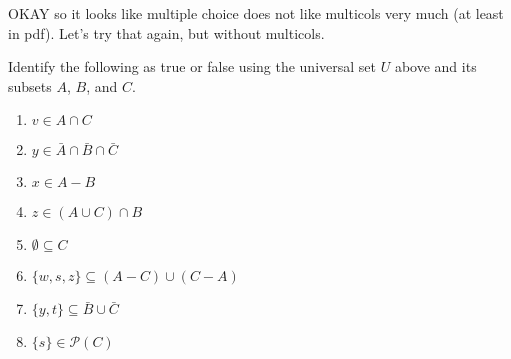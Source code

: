 \documentclass{ximera}
\begin{document}
OKAY so it looks like multiple choice does not like multicols very much (at least in pdf). Let's try that again, but without multicols.

\begin{question}  
Identify the following as true or false using the universal set $U$ above and its subsets $A$, $B$, and $C$.
\begin{prompt}
\begin{enumerate}
        \item $v \in A \cap C$
            \begin{multipleChoice}
            \end{multipleChoice} 
			
		\item $y \in \bar{A} \cap \bar{B} \cap \bar{C}$
		    \begin{multipleChoice}
            \end{multipleChoice}	
		\item $x \in A - B$
		    \begin{multipleChoice}
            \end{multipleChoice}	
		\item $z \in (A \cup C) \cap B$
		    \begin{multipleChoice}
            \end{multipleChoice}	
		\item $\emptyset \subseteq C$
		    \begin{multipleChoice}
            \end{multipleChoice}	
		\item $\{w, s, z\} \subseteq (A - C) \cup (C - A)$
		    \begin{multipleChoice}
            \end{multipleChoice}	
		\item $\{y,t\} \subseteq \bar{B} \cup \bar{C}$
		    \begin{multipleChoice}
            \end{multipleChoice}	
		\item $\{s\} \in \mathcal{P}(C)$
	        \begin{multipleChoice}
            \end{multipleChoice}
\end{enumerate}
\end{prompt}
\end{question}
\end{document}

